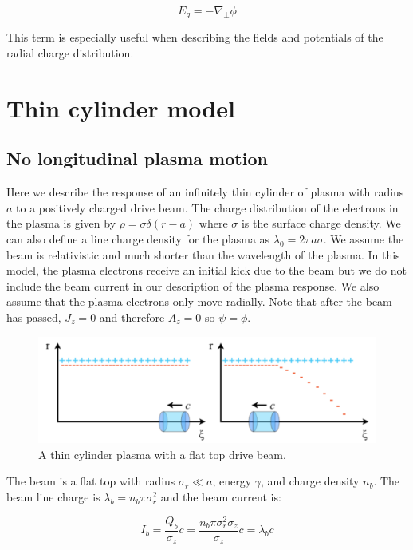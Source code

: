 \documentclass[aps,prl,preprint,groupedaddress]{revtex4-1}
\begin{document}
\begin{equation}\label{eq:E_guass}
E_g = -\nabla_\perp \phi
\end{equation}

This term is especially useful when describing the fields and potentials of the radial charge distribution.

\section{Thin cylinder model}
\subsection{No longitudinal plasma motion}
Here we describe the response of an infinitely thin cylinder of plasma with radius $a$ to a positively charged drive beam. The charge distribution of the electrons in the plasma is given by $\rho = \sigma \delta(r-a)$ where $\sigma$ is the surface charge density. We can also define a line charge density for the plasma as $\lambda_0 = 2\pi a \sigma$. We assume the beam is relativistic and much shorter than the wavelength of the plasma. In this model, the plasma electrons receive an initial kick due to the beam but we do not include the beam current in our description of the plasma response. We also assume that the plasma electrons only move radially. Note that after the beam has passed, $J_z=0$ and therefore $A_z=0$ so $\psi=\phi$.

\begin{figure}[ht]\label{fig:thin_cyl}
  \centering
    \includegraphics[width=150mm]{./figures/thin_cyl.pdf}
      \caption{A thin cylinder plasma with a flat top drive beam.}
\end{figure}

The beam is a flat top with radius $\sigma_r \ll a$, energy $\gamma$, and charge density $n_b$. The beam line charge is $\lambda_b = n_b \pi \sigma_r^2$ and the beam current is:

\begin{equation}\label{eq:I_beam}
I_b = \frac{Q_b}{\sigma_z}c = \frac{n_b \pi \sigma_r^2 \sigma_z}{\sigma_z}c = \lambda_b c
\end{equation}
\end{document}
